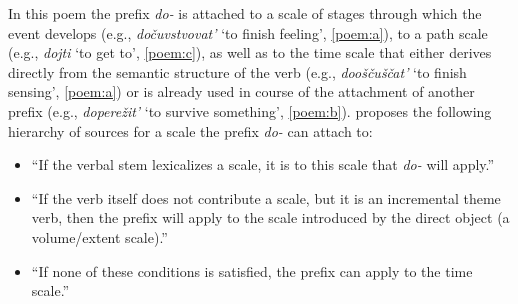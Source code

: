 In this poem the prefix \textit{do-}   is attached to a scale of stages through which the event develops (e.g., \textit{do\v{c}uvstvovat'} `to finish feeling', \ref{poem:a}), to a path scale (e.g., \textit{dojti} `to get to', \ref{poem:c}), as well as to the time scale that either derives directly from the semantic structure of the verb (e.g., \textit{doo\v{s}\v{c}u\v{s}\v{c}at'} `to finish sensing', \ref{poem:a}) or is already used in course of the attachment of another prefix (e.g., \textit{dopere\v{z}it'} `to survive something', \ref{poem:b}). \citet{Kagan:book} proposes the following hierarchy of sources for a scale the prefix \textit{do-}   can attach to: 

\begin{itemize}
\item ``If the verbal stem lexicalizes a scale, it is to this scale that \textit{do-}   will apply.''
\item ``If the verb itself does not contribute a scale, but it is an incremental
theme verb, then the prefix will apply to the scale introduced by the direct object (a volume/extent scale).''
\item ``If none of these conditions is satisfied, the prefix can apply to the time scale.''
\end{itemize}

